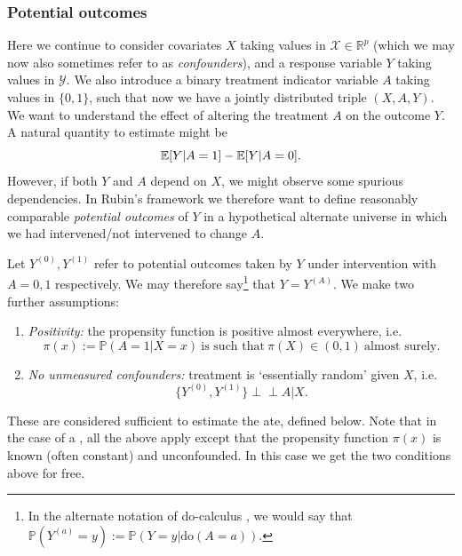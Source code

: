 \documentclass[thesis.tex]{subfiles}
\begin{document}
\subsubsection{Potential outcomes}
Here we continue to consider covariates $X$ taking values in $\mathcal{X} \in \mathbb{R}^p$ (which we may now also sometimes refer to as \emph{confounders}), and a response variable $Y$ taking values in $\mathcal{Y}$. We also introduce a binary treatment indicator variable $A$ taking values in $\{0,1\}$, such that now we have a jointly distributed triple $(X, A, Y)$. We want to understand the effect of altering the treatment $A$ on the outcome $Y$. A natural quantity to estimate might be
\[\mathbb{E}[Y | A = 1] - \mathbb{E}[Y | A = 0].\]
However, if both $Y$ and $A$ depend on $X$, we might observe some spurious dependencies. In Rubin's framework we therefore want to define reasonably comparable \emph{potential outcomes} of $Y$ in a hypothetical alternate universe in which we had intervened/not intervened to change $A$. 

Let $Y^{(0)}, Y^{(1)}$ refer to potential outcomes taken by $Y$ under intervention with $A=0,1$
respectively. We may therefore say\footnote{In the alternate notation of do-calculus \citep{pearl_causal_1995, pearl_-calculus_2012}, we would say that $\mathbb{P}(Y^{(a)} = y) := \mathbb{P}(Y = y |  \text{do}(A=a))$.} that $Y=Y^{(A)}$. We make two further assumptions: 
\begin{enumerate}
    \item \emph{Positivity:} the propensity function is positive almost everywhere, i.e. 
    \[\pi(x) := \mathbb{P}(A=1 | X = x) \  \text{is such that} \ \pi(X) \in (0,1) \ \text{almost surely.}\]
    \item \emph{No unmeasured confounders:} treatment is `essentially random' given $X$, i.e.
    \[\{Y^{(0)}, Y^{(1)}\} \perp\!\!\!\perp A | X. \]
\end{enumerate}
These are considered sufficient to estimate the {\gls{ate}}, defined below. Note that in the case of a , all the above apply except that the propensity function $\pi(x)$ is known (often constant) and unconfounded. In this case we get the two conditions above for free.
\end{document}
